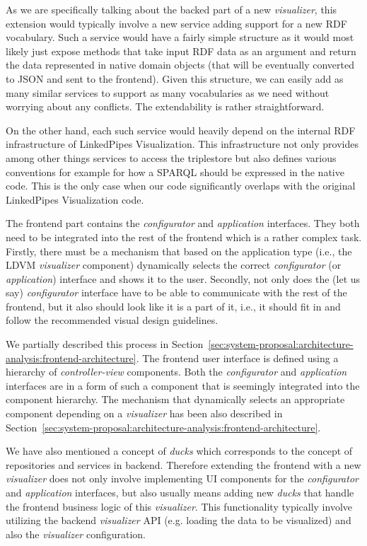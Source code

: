 As we are specifically talking about the backed part of a new \emph{visualizer}, this extension would typically involve a new service adding support for a new RDF vocabulary.  Such a service would have a fairly simple structure as it would most likely just expose methods that take input RDF data as an argument and return the data represented in native domain objects (that will be eventually converted to JSON and sent to the frontend). Given this structure, we can easily add as many similar services to support as many vocabularies as we need without worrying about any conflicts. The extendability is rather straightforward.

On the other hand, each such service would heavily depend on the internal RDF infrastructure of LinkedPipes Visualization. This infrastructure not only provides among other things services to access the triplestore but also defines various conventions for example for how a SPARQL should be expressed in the native code. This is the only case when our code significantly overlaps with the original LinkedPipes Visualization code.

The frontend part contains the \emph{configurator} and \emph{application} interfaces. They both need to be integrated into the rest of the frontend which is a rather complex task. Firstly, there must be a mechanism that based on the application type (i.e., the LDVM \emph{visualizer} component) dynamically selects the correct \emph{configurator} (or \emph{application}) interface and shows it to the user. Secondly, not only does the (let us say) \emph{configurator} interface have to be able to communicate with the rest of the frontend, but it also should  look like it is a part of it, i.e., it should fit in and follow the recommended visual design guidelines. 

We partially described this process in Section~\ref{sec:system-proposal:architecture-analysis:frontend-architecture}. The frontend user interface is defined using a hierarchy of \emph{controller-view} components. Both the \emph{configurator} and \emph{application} interfaces are in a form of such a component that is seemingly integrated into the component hierarchy. The mechanism that dynamically selects an appropriate component depending on a \emph{visualizer} has been also described in Section~\ref{sec:system-proposal:architecture-analysis:frontend-architecture}. 

We have also mentioned a concept of \emph{ducks} which corresponds to the concept of repositories and services in backend. Therefore extending the frontend with a new \emph{visualizer} does not only involve implementing UI components for the \emph{configurator}  and \emph{application} interfaces, but also usually means adding new \emph{ducks} that handle the frontend business logic of this \emph{visualizer}. This functionality typically involve utilizing the backend \emph{visualizer} API (e.g. loading the data to be visualized) and also the \emph{visualizer} configuration.

